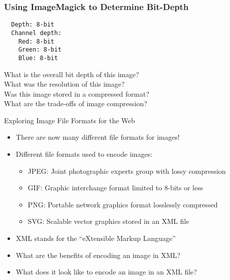 \documentclass[14pt,aspectratio=169]{beamer}
\begin{document}
%
\begin{frame}[fragile]
  \frametitle{Using ImageMagick to Determine Bit-Depth}
  \normalsize
  \begin{minipage}{6in}
    \vspace*{.1in}
    \begin{verbatim}
  Depth: 8-bit
  Channel depth:
    Red: 8-bit
    Green: 8-bit
    Blue: 8-bit
    \end{verbatim}
  \end{minipage}
  \vspace*{.15in}
  \begin{center}
    What is the overall bit depth of this image? \\
    What was the resolution of this image? \\
    Was this image stored in a compressed format? \\
    What are the trade-offs of image compression? \\
  \end{center}
\end{frame}

%
\begin{frame}{Exploring Image File Formats for the Web}
  \begin{itemize}
    \item There are now many different file formats for images!
      \vspace*{-.2in}
    \item Different file formats used to encode images:
      \begin{itemize}
        \item JPEG: Joint photographic experts group with lossy compression
        \item GIF: Graphic interchange format limited to 8-bits or less
        \item PNG: Portable network graphics format losslessly compressed
        \item SVG: Scalable vector graphics stored in an XML file
      \end{itemize}
      \vspace*{-.2in}
    \item XML stands for the ``eXtensible Markup Language''
      \vspace*{-.2in}
    \item What are the benefits of encoding an image in XML?
      \vspace*{-.2in}
    \item What does it look like to encode an image in an XML file?
      \vspace*{-.2in}
  \end{itemize}
\end{frame}
\end{document}
